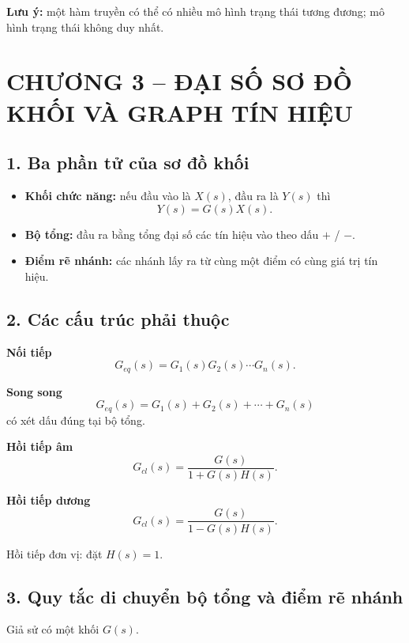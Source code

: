\medskip
\noindent\textbf{Lưu ý:}
một hàm truyền có thể có nhiều mô hình trạng thái tương đương; mô hình trạng thái không duy nhất.

\clearpage
\section*{CHƯƠNG 3 -- ĐẠI SỐ SƠ ĐỒ KHỐI VÀ GRAPH TÍN HIỆU}

\subsection*{1. Ba phần tử của sơ đồ khối}

\begin{itemize}[leftmargin=1.7em,itemsep=0.2em]
  \item \textbf{Khối chức năng:} nếu đầu vào là $X(s)$, đầu ra là $Y(s)$ thì
  \[
  Y(s)=G(s)X(s).
  \]
  \item \textbf{Bộ tổng:} đầu ra bằng tổng đại số các tín hiệu vào theo dấu $+$ / $-$.
  \item \textbf{Điểm rẽ nhánh:} các nhánh lấy ra từ cùng một điểm có cùng giá trị tín hiệu.
\end{itemize}

\subsection*{2. Các cấu trúc phải thuộc}

\textbf{Nối tiếp}
\[
\boxed{G_{eq}(s)=G_1(s)G_2(s)\cdots G_n(s)}.
\]

\textbf{Song song}
\[
\boxed{G_{eq}(s)=G_1(s)+G_2(s)+\cdots+G_n(s)}
\]
có xét dấu đúng tại bộ tổng.

\textbf{Hồi tiếp âm}
\[
\boxed{
G_{cl}(s)=\frac{G(s)}{1+G(s)H(s)}.
}
\]

\textbf{Hồi tiếp dương}
\[
\boxed{
G_{cl}(s)=\frac{G(s)}{1-G(s)H(s)}.
}
\]

Hồi tiếp đơn vị: đặt $H(s)=1$.

\subsection*{3. Quy tắc di chuyển bộ tổng và điểm rẽ nhánh}

Giả sử có một khối $G(s)$.

